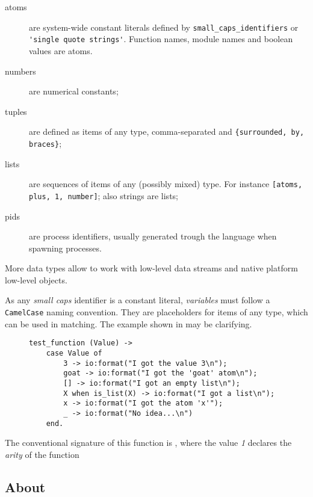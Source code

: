 \begin{description}

    \item[atoms] are system-wide constant literals defined by
        \lstinline{small_caps_identifiers} or
        \lstinline{'single quote strings'}. Function names, module
        names and boolean values are atoms.

    \item[numbers] are numerical constants;

    \item[tuples] are defined as items of any type, comma-separated and
        \lstinline|{surrounded, by, braces}|;

    \item[lists] are sequences of items of any (possibly mixed) type.
        For instance
        \lstinline{[atoms, plus, 1, number]}; also strings are lists;

    \item[pids] are process identifiers, usually generated trough the
        language  when spawning processes.

\end{description}

More data types allow to work with low-level data streams and native
platform low-level objects.

As any \emph{small caps} identifier is a constant literal,
\emph{variables} must follow a \lstinline{CamelCase} naming convention.
They are placeholders for items of any type, which can be used in
matching. The example shown in  may be clarifying.

\begin{figure}[tb!]
\begin{lstlisting}[caption={Example of \Erlang\ code},
                   label={code:Example}]
test_function (Value) ->
    case Value of
        3 -> io:format("I got the value 3\n");
        goat -> io:format("I got the 'goat' atom\n");
        [] -> io:format("I got an empty list\n");
        X when is_list(X) -> io:format("I got a list\n");
        x -> io:format("I got the atom 'x'");
        _ -> io:format("No idea...\n")
    end.
\end{lstlisting}
\end{figure}

The conventional signature of this function is ,
where the value \emph{1} declares the \emph{arity} of the function

\subsection{About \OTP}

